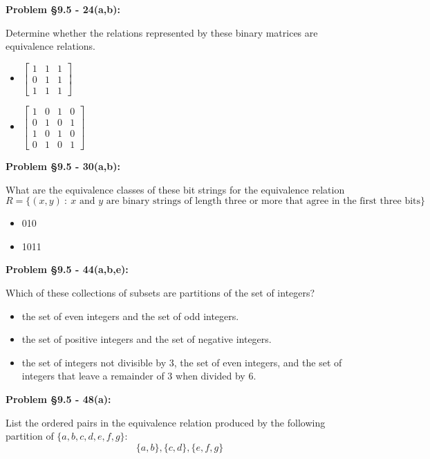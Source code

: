\documentclass{article}
\newenvironment{problem}[1]
    {\begin{mdframed}[default]
    \textbf{Problem #1:}
    }
    {\end{mdframed}
    }
\begin{document}
\begin{problem}{\S 9.5 - 24(a,b)}
Determine whether the relations represented by these binary matrices are equivalence relations.
\begin{itemize}
    \item[(a)] $\begin{bmatrix} 1 & 1 & 1 \\ 0 & 1 & 1 \\ 1 & 1 & 1 \end{bmatrix}$
    \item[(b)] $\begin{bmatrix} 1 & 0 & 1 & 0 \\ 0 & 1 & 0 & 1 \\ 1 & 0 & 1 & 0 \\ 0 & 1 & 0 & 1 \end{bmatrix}$
\end{itemize}
\end{problem}

\begin{problem}{\S 9.5 - 30(a,b)}
What are the equivalence classes of these bit strings for the equivalence relation
\[ R = \{ (x,y)~:~ x \textrm{ and } y \textrm{ are binary strings of length three or more that agree in the first three bits}\} \]
\begin{itemize}
    \item[(a)] 010
    \item[(b)] 1011
\end{itemize}
\end{problem}

\begin{problem}{\S 9.5 - 44(a,b,e)}
Which of these collections of subsets are partitions of the set of integers?
\begin{itemize}
    \item[(a)] the set of even integers and the set of odd integers.
    \item[(b)] the set of positive integers and the set of negative integers.
    \item[(e)] the set of integers not divisible by 3, the set of even integers, and the set of integers that leave a remainder of 3 when divided by 6.
\end{itemize}
\end{problem}

\begin{problem}{\S 9.5 - 48(a)}
List the ordered pairs in the equivalence relation produced by the following partition of $\{ a, b, c, d, e, f, g \}$:
\[ \{ a, b \}, \{ c, d \}, \{ e, f, g \} \]
\end{problem}
\end{document}
